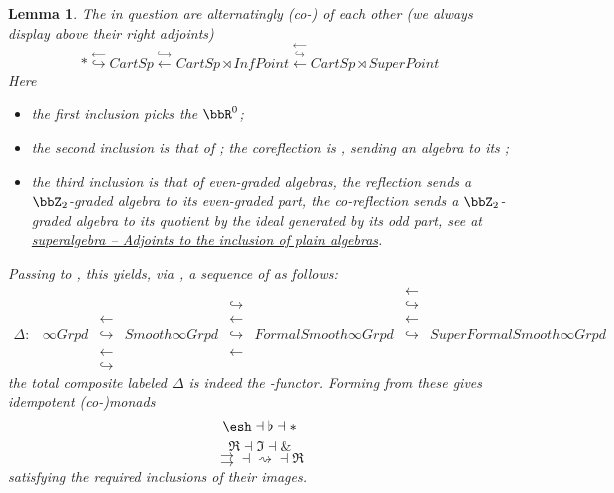 \documentclass[12pt,titlepage]{article}
\newcommand{\itexarray}[1]{\begin{matrix}#1\end{matrix}}
\theoremstyle{plain}
\newtheorem{lemma}{Lemma}
\theoremstyle{definition}
\theoremstyle{remark}
\begin{document}
\begin{lemma}
\label{SequenceOfSites}\hypertarget{SequenceOfSites}{}
The  in question are alternatingly (co-) of each other (we always display  above their right adjoints)
\begin{displaymath}
\ast
\stackrel{\longleftarrow}{\hookrightarrow}
CartSp
\stackrel{\hookrightarrow}{\longleftarrow}
CartSp\rtimes InfPoint
\stackrel{\longleftarrow}{\stackrel{\hookrightarrow}{\longleftarrow}}
CartSp \rtimes SuperPoint
\end{displaymath}
Here
\begin{itemize}%
\item the first inclusion picks the  $\bbR^0$;
\item the second inclusion is that of ; the coreflection is , sending an algebra to its ;
\item the third inclusion is that of even-graded algebras, the reflection sends a $\bbZ_2$-graded algebra to its even-graded part, the co-reflection sends a $\bbZ_2$-graded algebra to its quotient by the ideal generated by its odd part, see at \emph{\href{super+algebra#AdjointsToInclusionOfPlainAlgebra}{superalgebra -- Adjoints to the inclusion of plain algebras}}.
\end{itemize}
Passing to , this yields, via , a sequence of  as follows:
\begin{displaymath}
\itexarray{
& && && &\longleftarrow&
\\
& && &\hookrightarrow& &\hookrightarrow&
\\
& &\longleftarrow& &\longleftarrow& &\longleftarrow&
\\
\Delta \colon
&
\infty Grpd
&\hookrightarrow&
Smooth \infty Grpd
&\hookrightarrow&
FormalSmooth \infty Grpd
&\hookrightarrow&
SuperFormalSmooth \infty Grpd
\\
& &\longleftarrow& &\longleftarrow&
\\
& &\hookrightarrow&
}
\end{displaymath}
the total composite labeled $\Delta$ is indeed the -functor.
Forming  from these  gives idempotent (co-)monads
\begin{displaymath}
\esh  \dashv \flat \dashv \ast
\end{displaymath}
\begin{displaymath}
\Re \dashv \Im \dashv \&
\end{displaymath}
\begin{displaymath}
\rightrightarrows \dashv \rightsquigarrow \dashv \Re
\end{displaymath}
satisfying the required inclusions of their images.
\end{lemma}
\end{document}
